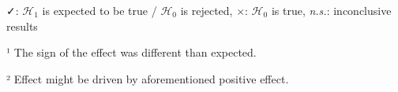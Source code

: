 \begin{table}
\begin{threeparttable}
\begin{tabular*}{\textwidth}{lccc}
\bottomrule
\end{tabular*}
 \begin{tablenotes}[flushleft]
      \small
      \item ✓: $\mathcal{H_1}$ is expected to be true / $\mathcal{H_0}$ is rejected, ×: $\mathcal{H_0}$ is true, \textit{n.s.}: inconclusive results 
      \item ¹ The sign of the effect was different than expected. 
      \item ² Effect might be driven by aforementioned positive effect.
    \end{tablenotes}
 \end{threeparttable}
\end{table}

